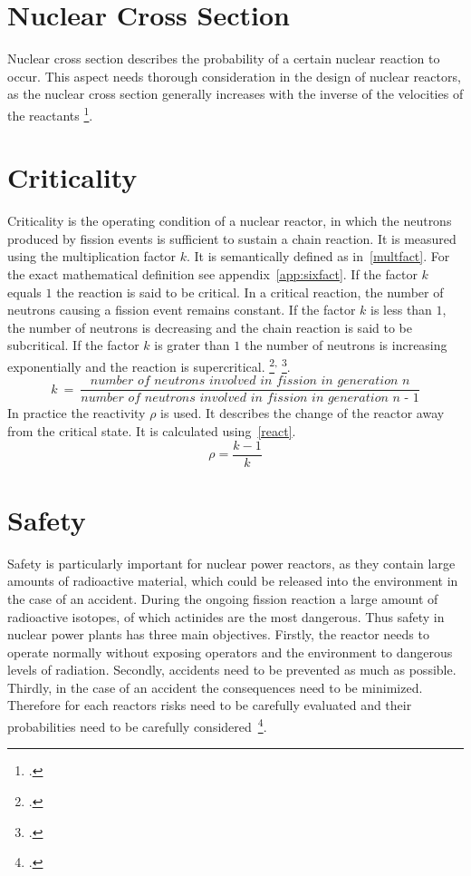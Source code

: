 \section{Nuclear Cross Section}
Nuclear cross section describes the probability of a certain nuclear reaction to occur. This
aspect needs thorough consideration in the design of nuclear reactors, as the nuclear cross section
generally increases with the inverse of the velocities of the reactants \footcite[108]{nucfundamentals}.

\section{Criticality}
Criticality is the operating condition of a nuclear reactor, in which the neutrons produced by fission
events is sufficient to sustain a chain reaction. It is measured using the multiplication factor
$k$. It is semantically defined as in~\ref{multfact}. For the exact mathematical definition see 
appendix~\ref{app:sixfact}. If the factor $k$ equals $1$ the reaction is said to be
critical. In a critical reaction, the number of neutrons causing a fission event remains constant. 
If the factor $k$ is less than $1$, the number of neutrons is decreasing and the chain reaction is said to be subcritical. If the factor
$k$ is grater than $1$ the number of neutrons is increasing exponentially and the reaction is supercritical.
\footcite[308]{nucfundamentals}\textsuperscript{,} \footcite[39]{ReactorPhysics}.
\begin{equation}
    \label{multfact}
    k~=~\frac{\textit{number of neutrons involved in fission in generation n}}{\textit{number of neutrons involved in fission in generation n - 1}}
\end{equation}
In practice the reactivity $\rho$ is used. It describes the change of the reactor away from the critical
state. It is calculated using~\ref{react}.
\begin{equation}
    \label{react}
    \rho = \frac{k-1}{k}
\end{equation}

\section{Safety}
Safety is particularly important for nuclear power reactors, as they contain large amounts of radioactive
material, which could be released into the environment in the case of an accident. During the ongoing
fission reaction a large amount of radioactive isotopes, of which actinides are the most dangerous.
Thus safety in nuclear power plants has three main objectives. Firstly, the reactor needs to operate normally
without exposing operators and the environment to dangerous levels of radiation. Secondly, accidents need
to be prevented as much as possible. Thirdly, in the case of an accident the consequences need to be minimized.
Therefore for each reactors risks need to be carefully evaluated and their probabilities need to be
carefully considered~\footcite[793]{engHandbook}.


